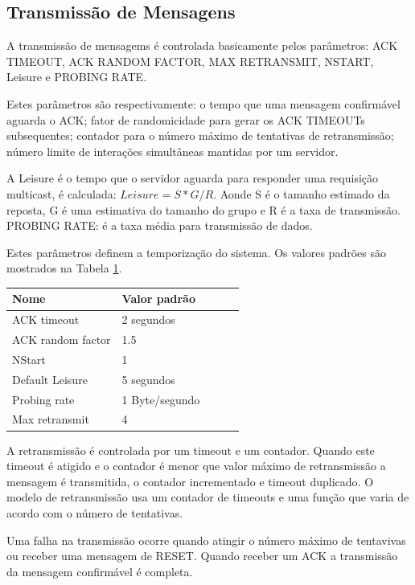 \subsection{Transmiss\~ao de Mensagens}
A transmiss\~ao de mensagems \'e controlada basicamente pelos par\^ametros: ACK TIMEOUT, ACK RANDOM FACTOR, MAX RETRANSMIT, NSTART, Leisure e PROBING RATE.

Estes par\^ametros s\~ao respectivamente: o tempo que uma mensagem confirm\'avel aguarda o ACK; fator de randomicidade para gerar os ACK TIMEOUTs subsequentes; contador para o n\'umero m\'aximo de tentativas de retransmiss\~ao; n\'umero limite de intera\c{c}\~oes simult\^aneas mantidas por um servidor.

A Leisure \'e o tempo que o servidor aguarda para responder uma requisi\c{c}\~ao multicast, \'e calculada: $Leisure = S * G / R$. Aonde S \'e o tamanho estimado da reposta, G \'e uma estimativa do tamanho do grupo e R \'e a taxa de transmiss\~ao. PROBING RATE: \'e a taxa m\'edia para transmiss\~ao de dados.

    Estes par\^ametros definem a temporiza\c{c}\~ao do sistema. Os valores padr\~oes s\~ao mostrados na Tabela \ref{coapDefault}.
\begin{table}[h]
\label{coapDefault}
\centering
\begin{tabular}{@{}lllll@{}}
\toprule
Nome & Valor padr\~ao & \\ \midrule
ACK timeout & 2 segundos & \\
ACK random factor & 1.5 & \\
NStart & 1 & \\
Default Leisure & 5 segundos & \\
Probing rate & 1 Byte/segundo & \\
Max retransmit & 4 &  \\ \midrule
\end{tabular}
\end{table}

A retransmiss\~ao \'e controlada por um timeout e um contador. Quando este timeout \'e atigido e o contador \'e menor que valor m\'aximo de retransmiss\~ao a mensagem \'e transmitida, o contador incrementado e timeout duplicado. O modelo de retransmiss\~ao usa um contador de timeouts e uma fun\c{c}\~ao que varia de acordo com o n\'umero de tentativas.

Uma falha na transmiss\~ao ocorre quando atingir o n\'umero m\'aximo de tentavivas ou receber uma mensagem de RESET. Quando receber um ACK a transmiss\~ao da mensagem confirm\'avel \'e completa.

